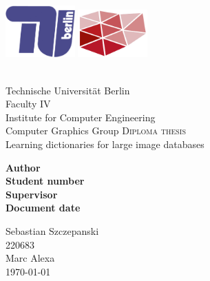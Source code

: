 
\begin{titlepage}


\includegraphics[width=0.2\textwidth]{images/logo/tu-logo_2d_blau.png}
\hfill
\includegraphics[width=0.2\textwidth]{images/logo/dgm_red.pdf}\\
\vspace{20pt}\\
\begin{center} 
Technische Universit\"{a}t Berlin\\
Faculty IV\\
Institute for Computer Engineering\\
Computer Graphics Group
\vfill
\textsc{\Large Diploma thesis}\\[0.5cm]
{\huge Learning dictionaries for large image databases}\\
[0.4cm]


\vfill
\begin{minipage}[t]{0.48\textwidth}
\flushright
\textbf{Author}\\
\textbf{Student number}\\
\textbf{Supervisor}\\
\textbf{Document date}
\end{minipage}
\begin{minipage}[t]{0.48\textwidth}
\flushleft 
Sebastian Szczepanski\\
220683\\
Marc Alexa\\
\today{}
\end{minipage}
\end{center}

\end{titlepage}

\clearpage

% 
% 
